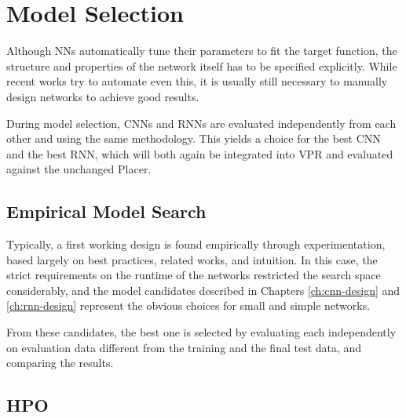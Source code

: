 \pagebreak

\section{Model Selection}\label{ch:model-selection}

Although \glspl{NN} automatically tune their parameters to fit the target function, the structure and properties of the network itself has to be specified explicitly. While recent works try to automate even this, it is usually still necessary to manually design networks to achieve good results.

During model selection, \glspl{CNN} and \glspl{RNN} are evaluated independently from each other and using the same methodology. This yields a choice for the best \gls{CNN} and the best \gls{RNN}, which will both again be integrated into \gls{VPR} and evaluated against the unchanged Placer.  

\subsection{Empirical Model Search}

Typically, a first working design is found empirically through experimentation, based largely on best practices, related works, and intuition. In this case, the strict requirements on the runtime of the networks restricted the search space considerably, and the model candidates described in Chapters \ref{ch:cnn-design} and \ref{ch:rnn-design} represent the obvious choices for small and simple networks.

From these candidates, the best one is selected by evaluating each independently on evaluation data different from the training and the final test data, and comparing the results.

\pagebreak

\subsection{\gls{HPO}}

